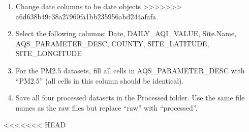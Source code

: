 \documentclass[
]{article}
\providecommand{\tightlist}{%
  \setlength{\itemsep}{0pt}\setlength{\parskip}{0pt}}
\begin{document}
\begin{enumerate}
\def\labelenumi{\arabic{enumi}.}
\setcounter{enumi}{2}
\tightlist
\item
  Change date columns to be date objects
  \textgreater\textgreater\textgreater\textgreater\textgreater\textgreater\textgreater{}
  a6d638b49c38a27960fa1bb235956abd244afafa
\item
  Select the following columns: Date, DAILY\_AQI\_VALUE, Site.Name,
  AQS\_PARAMETER\_DESC, COUNTY, SITE\_LATITUDE, SITE\_LONGITUDE
\item
  For the PM2.5 datasets, fill all cells in AQS\_PARAMETER\_DESC with
  ``PM2.5'' (all cells in this column should be identical).
\item
  Save all four processed datasets in the Processed folder. Use the same
  file names as the raw files but replace ``raw'' with ``processed''.
\end{enumerate}

\textless\textless\textless\textless\textless\textless\textless{} HEAD
\end{document}
